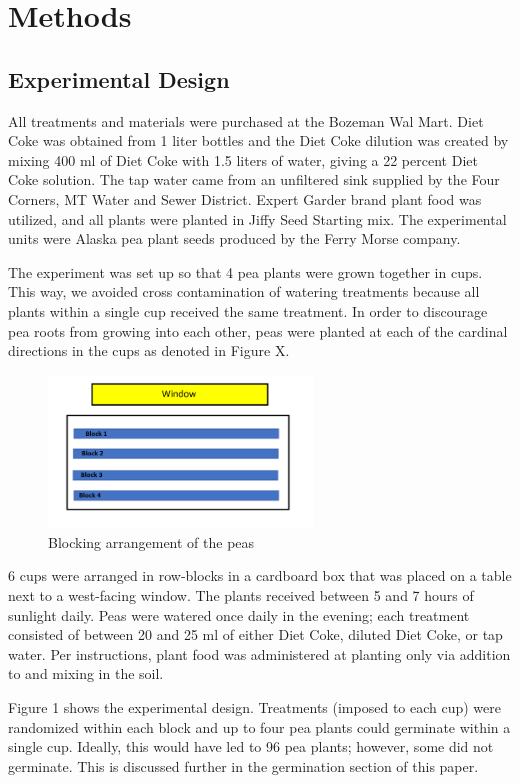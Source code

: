 \documentclass[1p,12pt]{elsarticle}\usepackage[]{graphicx}\usepackage[]{color}
\begin{document}
\section{Methods}
\subsection{Experimental Design}

All treatments and materials were purchased at the Bozeman Wal Mart. Diet Coke was obtained from 1 liter bottles and the Diet Coke dilution was created by mixing 400 ml of Diet Coke with 1.5 liters of water, giving a 22 percent Diet Coke solution. The tap water came from an unfiltered sink supplied by the Four Corners, MT Water and Sewer District. Expert Garder brand plant food was utilized, and all plants were planted in Jiffy Seed Starting mix.  The experimental units were Alaska pea plant seeds produced by the Ferry Morse company. 

The experiment was set up so that 4 pea plants were grown together in cups. This way, we avoided cross contamination of watering treatments because all plants within a single cup received the same treatment.  In order to discourage pea roots from growing into each other, peas were planted at each of the cardinal directions in the cups as denoted in Figure X. 
 \begin{figure}[h!]
 	\caption{Blocking arrangement of the peas}
 	\centering
	\includegraphics[width = 7cm]{blocks.png}
\end{figure}


6 cups were arranged in row-blocks in a cardboard box that was placed on a table next to a west-facing window. The plants received between 5 and 7 hours of sunlight daily.  Peas were watered once daily in the evening; each treatment consisted of between 20 and 25 ml of either Diet Coke, diluted Diet Coke, or tap water. Per instructions, plant food was administered at planting only via addition to and mixing in the soil.  

Figure 1 shows the experimental design. Treatments (imposed to each cup) were randomized within each block and up to four pea plants could germinate within a single cup. Ideally, this would have led to 96 pea plants; however, some did not germinate. This is discussed further in the germination section of this paper. 
\end{document}
